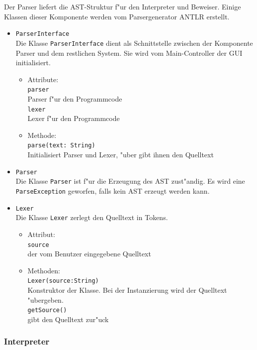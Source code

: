 \documentclass[10pt,a4paper,titlepage]{article}
\begin{document}
Der Parser liefert die AST-Struktur f"ur den Interpreter und Beweiser. Einige Klassen dieser Komponente werden vom Parsergenerator ANTLR erstellt. 
\begin{itemize}
\item \texttt{ParserInterface} \\
Die Klasse \texttt{ParserInterface} dient als Schnittstelle zwischen der Komponente Parser und dem restlichen System. Sie wird vom Main-Controller der GUI initialisiert. 
\begin{itemize}
\item Attribute: \\
\texttt{parser} \\
Parser f"ur den Programmcode \\
\texttt{lexer} \\
Lexer f"ur den Programmcode 
\item Methode: \\
\texttt{parse(text: String)} \\
Initialisiert Parser und Lexer, "uber gibt ihnen den Quelltext
\end{itemize}
\item \texttt{Parser} \\
Die Klasse \texttt{Parser} ist f"ur die Erzeugung des AST zust"andig. Es wird eine \texttt{ParseException} geworfen, falls kein AST erzeugt werden kann. 
\item \texttt{Lexer} \\
Die Klasse \texttt{Lexer} zerlegt den Quelltext in Tokens. 
\begin{itemize}
\item Attribut: \\
\texttt{source} \\
der vom Benutzer eingegebene Quelltext 
\item Methoden: \\
\texttt{Lexer(source:String)} \\
Konstruktor der Klasse. Bei der Instanzierung wird der Quelltext "ubergeben. \\
\texttt{getSource()} \\
gibt den Quelltext zur"uck \\
\end{itemize}
\end{itemize}

\subsubsection{Interpreter}
\end{document}
